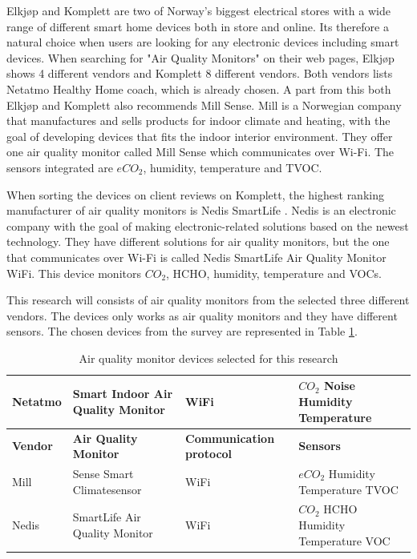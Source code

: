 Elkjøp \cite{Elkjøp} and Komplett \cite{Komplett} are two of Norway's biggest electrical stores with a wide range of different smart home devices both in store and online. Its therefore a natural choice when users are looking for any electronic devices including smart devices. When searching for "Air Quality Monitors" on their web pages, Elkjøp shows 4 different vendors and Komplett 8 different vendors. Both vendors lists Netatmo Healthy Home coach, which is already chosen. A part from this both Elkjøp and Komplett also recommends Mill Sense. Mill \cite{Mill} is a Norwegian company that manufactures and sells products for indoor climate and heating, with the goal of developing devices that fits the indoor interior environment. They offer one air quality monitor called Mill Sense which communicates over \gls{Wi-Fi}. The sensors integrated are \(eCO_2\), humidity, temperature and \gls{TVOC}.

When sorting the devices on client reviews on Komplett, the highest ranking manufacturer of air quality monitors is Nedis SmartLife \cite{Komplett}. Nedis \cite{Nedis} is an electronic company with the goal of making electronic-related solutions based on the newest technology. They have different solutions for air quality monitors, but the one that communicates over \gls{Wi-Fi} is called Nedis SmartLife Air Quality Monitor WiFi. This device monitors \(CO_2\), HCHO, humidity, temperature and VOCs. 

This research will consists of air quality monitors from the selected three different vendors. The devices only works as air quality monitors and they have different sensors. The chosen devices from the survey are represented in Table \ref{tab:AQMSurvey}. 

\begin{table}[H]
    \centering
    \caption{Air quality monitor devices selected for this research}
    \begin{tabular}{| p{1.5cm} | p{5.5cm} | p{3cm} | p{2cm} |} 
        \hline
        Netatmo & Smart Indoor Air Quality Monitor & WiFi & \(CO_2\) \newline Noise \newline Humidity \newline Temperature \\
        \hline
        \textbf{Vendor} & \textbf{Air Quality Monitor} & \textbf{Communication protocol} & \textbf{Sensors} \\
        \hline
        Mill & Sense Smart Climatesensor & WiFi & \(eCO_2\) \newline Humidity \newline Temperature \newline \gls{TVOC} \\
        \hline
        Nedis & SmartLife Air Quality Monitor & WiFi & \(CO_2\) \newline HCHO \newline Humidity \newline Temperature \newline VOC \\
        \hline

    \end{tabular}
    \label{tab:AQMSurvey}
\end{table}


